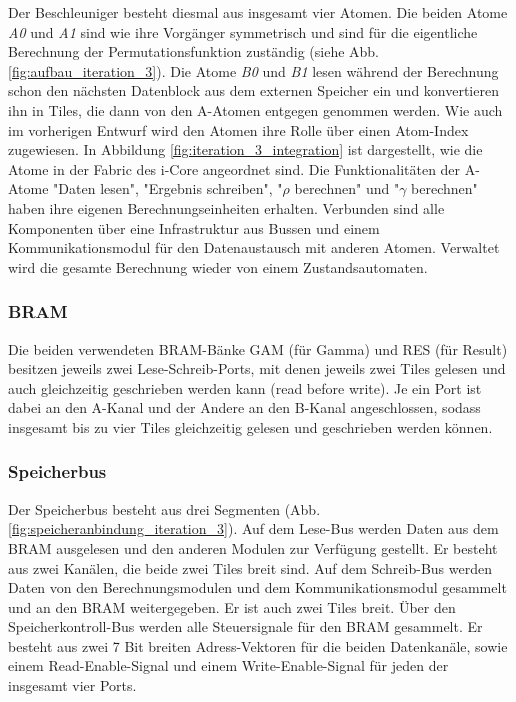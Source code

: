 Der Beschleuniger besteht diesmal aus insgesamt vier Atomen. Die beiden Atome \textit{A0} und \textit{A1} sind wie ihre Vorgänger symmetrisch und
sind für die eigentliche Berechnung der Permutationsfunktion zuständig (siehe Abb. \ref{fig:aufbau_iteration_3}). Die Atome \textit{B0} und \textit{B1} lesen während der Berechnung schon
den nächsten Datenblock aus dem externen Speicher ein und konvertieren ihn in Tiles, die dann von den A-Atomen entgegen genommen werden.
Wie auch im vorherigen Entwurf wird den Atomen ihre Rolle über einen Atom-Index zugewiesen. In Abbildung \ref{fig:iteration_3_integration}
ist dargestellt, wie die Atome in der Fabric des i-Core angeordnet sind. Die Funktionalitäten der A-Atome "Daten lesen", "Ergebnis schreiben",
"$\rho$ berechnen" und "$\gamma$ berechnen" haben ihre eigenen Berechnungseinheiten erhalten. Verbunden sind alle Komponenten über eine Infrastruktur
aus Bussen und einem Kommunikationsmodul für den Datenaustausch mit anderen Atomen. Verwaltet wird die gesamte Berechnung wieder von einem Zustandsautomaten.

\subsubsection{BRAM}
Die beiden verwendeten BRAM-Bänke GAM (für Gamma) und RES (für Result) besitzen jeweils zwei Lese-Schreib-Ports, mit denen jeweils zwei Tiles
gelesen und auch gleichzeitig geschrieben werden kann (read before write). Je ein Port ist dabei an den A-Kanal und der Andere an den B-Kanal angeschlossen,
sodass insgesamt bis zu vier Tiles gleichzeitig gelesen und geschrieben werden können. 

\subsubsection{Speicherbus}
Der Speicherbus besteht aus drei Segmenten (Abb. \ref{fig:speicheranbindung_iteration_3}). Auf dem Lese-Bus werden Daten aus dem BRAM ausgelesen und den anderen Modulen zur Verfügung gestellt.
Er besteht aus zwei Kanälen, die beide zwei Tiles breit sind.
Auf dem Schreib-Bus werden Daten von den Berechnungsmodulen und dem Kommunikationsmodul gesammelt und an den BRAM weitergegeben.
Er ist auch zwei Tiles breit. Über den Speicherkontroll-Bus werden alle Steuersignale für den BRAM gesammelt.
Er besteht aus zwei 7 Bit breiten Adress-Vektoren für die beiden Datenkanäle, sowie einem Read-Enable-Signal
und einem Write-Enable-Signal für jeden der insgesamt vier Ports.

